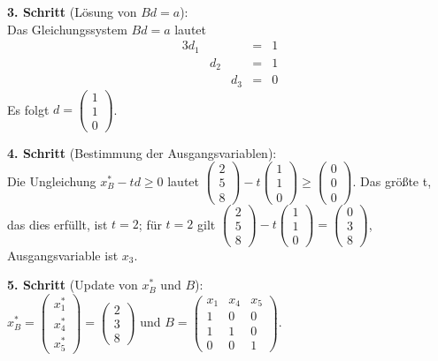 \documentclass[10pt,a4paper,oneside,ngerman,numbers=noenddot]{scrartcl}
\begin{document}
		\textbf{3. Schritt} (Lösung von $Bd = a$):\\
		Das Gleichungssystem $Bd = a$ lautet
		\begin{alignat*}{3}
			d_{1} & & &=& 1 \\
			& d_{2} & &=& 1 \\
			& & d_{3} &=& 0
		\end{alignat*}
		Es folgt $d = \begin{pmatrix}1 \\ 1 \\ 0 \end{pmatrix}$.
		
		\textbf{4. Schritt} (Bestimmung der Ausgangsvariablen):\\
		Die Ungleichung $x_{B}^{*} - td \geq 0$ lautet $\begin{pmatrix} 2 \\ 5 \\ 8\end{pmatrix} - t \begin{pmatrix}1 \\ 1 \\ 0 \end{pmatrix} \geq \begin{pmatrix} 0 \\ 0 \\ 0 \end{pmatrix}$. Das größte t, das dies erfüllt, ist $t = 2$; für $t = 2$ gilt $\begin{pmatrix} 2 \\ 5 \\ 8\end{pmatrix} - t \begin{pmatrix}1 \\ 1 \\ 0 \end{pmatrix} = \begin{pmatrix} 0 \\ 3 \\ 8 \end{pmatrix}$, Ausgangsvariable ist $x_{3}$.
		
		\textbf{5. Schritt} (Update von $x_{B}^{*}$ und $B$):\\
		$x_{B}^{*} = \begin{pmatrix} x_{1}^{*} \\ x_{4}^{*} \\ x_{5}^{*} \end{pmatrix} = \begin{pmatrix} 2 \\ 3 \\ 8 \end{pmatrix}$ und $B = \begin{pmatrix} x_{1} & x_{4} & x_{5} \\ 1 & 0 & 0 \\ 1 & 1 & 0 \\ 0 & 0 & 1 \end{pmatrix}$.
		
\end{document}
